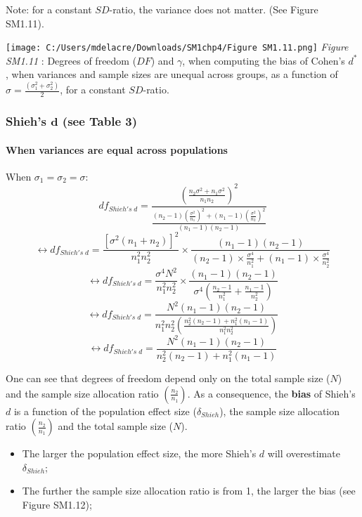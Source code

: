 \documentclass[
  english,
  man,mask,floatsintext]{apa6}
\let\oldparagraph\paragraph
\renewcommand{\paragraph}[1]{\oldparagraph{#1}\mbox{}}
\begin{document}
Note: for a constant \(SD\)-ratio, the variance does not matter. (See Figure SM1.11).

\texttt{[image: C:/Users/mdelacre/Downloads/SM1chp4/Figure SM1.11.png]}
\emph{Figure SM1.11} : Degrees of freedom (\(DF\)) and \(\gamma\), when computing the bias of Cohen's \(d^*\), when variances and sample sizes are unequal across groups, as a function of \(\sigma= \frac{(\sigma_1^2+\sigma_2^2)}{2}\), for a constant \(SD\)-ratio.

\hypertarget{shiehs-bmd-see-table-3}{%
\subsubsection{\texorpdfstring{Shieh's \(\bm{d}\) (see Table 3)}{Shieh's \textbackslash bm\{d\} (see Table 3)}}\label{shiehs-bmd-see-table-3}}

\hypertarget{when-variances-are-equal-across-populations-1}{%
\paragraph{When variances are equal across populations}\label{when-variances-are-equal-across-populations-1}}

When \(\sigma_1=\sigma_2=\sigma\):
\[df_{Shieh's \; d} = \frac{\left( \frac{n_2\sigma^2+n_1\sigma^2}{n_1n_2}\right)^2}{\frac{(n_2-1)\left( \frac{\sigma^2}{n_1}\right)^2+(n_1-1)\left( \frac{\sigma^2}{n_2}\right)^2}{(n_1-1)(n_2-1)}}\]
\[\leftrightarrow df_{Shieh's \; d} = \frac{[\sigma^2(n_1+n_2)]^2}{n_1^2n_2^2} \times \frac{(n_1-1)(n_2-1)}{(n_2-1) \times  \frac{\sigma^4}{n_1^2}+(n_1-1) \times \frac{\sigma^4}{n_2^2}}\]
\[\leftrightarrow df_{Shieh's \; d} = \frac{\sigma^4N^2}{n_1^2n_2^2} \times \frac{(n_1-1)(n_2-1)}{\sigma^4 \left( \frac{n_2-1}{n^2_1}+\frac{n_1-1}{n^2_2}\right) }\]
\[\leftrightarrow df_{Shieh's \; d} = \frac{N^2(n_1-1)(n_2-1)}{n_1^2n_2^2 \left( \frac{n_2^2(n_2-1)+n_1^2(n_1-1)}{n_1^2n_2^2}\right)}\]
\[\leftrightarrow df_{Shieh's \; d} = \frac{N^2(n_1-1)(n_2-1)}{n_2^2(n_2-1)+n_1^2(n_1-1)}\]

One can see that degrees of freedom depend only on the total sample size (\(N\)) and the sample size allocation ratio \(\left( \frac{n_2}{n_1}\right)\). As a consequence, the \textbf{bias} of Shieh's \(d\) is a function of the population effect size (\(\delta_{Shieh}\)), the sample size allocation ratio \(\left( \frac{n_2}{n_1}\right)\) and the total sample size (\(N\)).

\begin{itemize}
\item
  The larger the population effect size, the more Shieh's \(d\) will overestimate \(\delta_{Shieh}\);
\item
  The further the sample size allocation ratio is from 1, the larger the bias (see Figure SM1.12);
\end{itemize}
\end{document}

